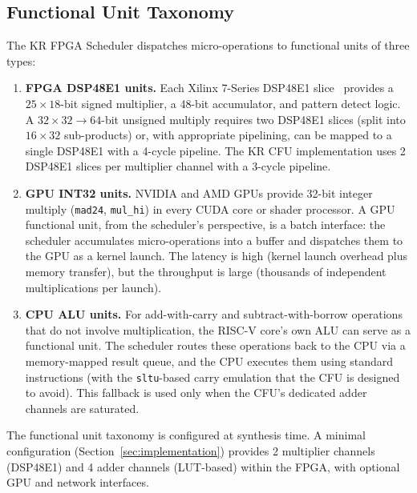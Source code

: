 \documentclass[11pt,a4paper]{article}
\begin{document}
\subsection{Functional Unit Taxonomy}
\label{sec:fu-taxonomy}

The KR FPGA Scheduler dispatches micro-operations to functional units of
three types:

\begin{enumerate}[leftmargin=*]
  \item \textbf{FPGA DSP48E1 units.}  Each Xilinx 7-Series DSP48E1
    slice~\cite{dsp48e1ug} provides a $25 \times 18$-bit signed multiplier,
    a 48-bit accumulator, and pattern detect logic.  A $32 \times 32 \to 64$-bit
    unsigned multiply requires two DSP48E1 slices (split into
    $16 \times 32$ sub-products) or, with appropriate pipelining, can be
    mapped to a single DSP48E1 with a 4-cycle pipeline.  The KR CFU
    implementation uses 2 DSP48E1 slices per multiplier channel with a
    3-cycle pipeline.

  \item \textbf{GPU INT32 units.}  NVIDIA and AMD GPUs provide 32-bit
    integer multiply (\texttt{mad24}, \texttt{mul\_hi}) in every CUDA core
    or shader processor.  A GPU functional unit, from the scheduler's
    perspective, is a batch interface: the scheduler accumulates micro-operations
    into a buffer and dispatches them to the GPU as a kernel launch.  The
    latency is high (kernel launch overhead plus memory transfer), but the
    throughput is large (thousands of independent multiplications per launch).

  \item \textbf{CPU ALU units.}  For add-with-carry and subtract-with-borrow
    operations that do not involve multiplication, the RISC-V core's own ALU
    can serve as a functional unit.  The scheduler routes these operations back
    to the CPU via a memory-mapped result queue, and the CPU executes them using
    standard instructions (with the \texttt{sltu}-based carry emulation that
    the CFU is designed to avoid).  This fallback is used only when the CFU's
    dedicated adder channels are saturated.
\end{enumerate}

The functional unit taxonomy is configured at synthesis time.  A minimal
configuration (Section~\ref{sec:implementation}) provides 2 multiplier
channels (DSP48E1) and 4 adder channels (LUT-based) within the FPGA,
with optional GPU and network interfaces.
\end{document}
